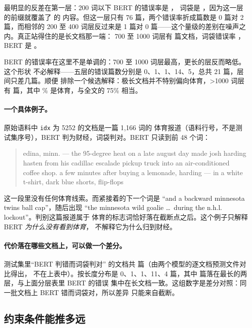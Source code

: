 \documentclass[11pt]{article}
\newcommand{\code}[1]{\texttt{\small #1}}
\begin{document}
最明显的反差在第一层：200 词以下 BERT 的错误率是 \resultByLenShortBert{}，
词袋是 \resultByLenShortBow{}，因为这一层的前缀就覆盖了 \resultSeenShort{} 的
内容。但这一层只有 76 篇，两个错误率折成篇数是 0 篇对 2 篇，而相邻的 200 至 400
词层反过来是 1 篇对 0 篇——这个量级的差别在噪声之内。真正站得住的是长文档那一端：
700 至 1000 词层有 \resultDocsPeak{} 篇文档，词袋错误率 \resultByLenPeakBow{}，
BERT 是 \resultByLenPeakBert{}。

BERT 的错误率在这里不是单调的：700 至 1000 词层最高，更长的层反而略低。这个形状
不必解释——五层的错误篇数分别是 0、1、1、14、5，总共 21 篇，层间只差几篇。顺便
排除一个候选解释：极长文档并不特别偏向体育，>1000 词层有 \resultLongestBinDocs{}
篇，其中 \resultLongestBinSports{}\% 是体育，与全文的 75\% 相当。



\paragraph{一个具体例子。} 原始语料中 \code{idx} 为 5252 的文档是一篇 1{,}166 词的
体育报道（语料行号，不是测试集序号），BERT 判为财经，词袋判对。BERT 只读到前 48
个词：

\begin{quote}\small
edina, minn. --- the 95-degree heat on a late august day made josh harding hasten
from his cadillac escalade pickup truck into an air-conditioned coffee shop. a few
minutes after buying a lemonade, harding --- in a white t-shirt, dark blue shorts,
flip-flops
\end{quote}

这一段里没有任何体育线索。而紧接着的下一个词是
``and a backward minnesota twins ball cap''，随后出现
``the minnesota wild goalie \dots\ during the n.h.l. lockout''。判别这篇报道属于
体育的标志词恰好落在截断点之后。这个例子只解释 BERT \emph{为什么没有看到体育}，
不解释它为什么归到财经。

\paragraph{代价落在哪些文档上，可以做一个差分。} 测试集里``BERT 判错而词袋判对''
的文档共 \resultBertWrongBowRight{} 篇（由两个模型的逐文档预测文件对比得出，
不在上表中）。按长度分布是 0、1、1、11、4 篇，其中
\resultBertWrongBowRightLong{} 篇落在最长的两层，与上面分层表里 BERT 的错误
集中在长文档一致。这组数字是差分对照：同一批文档上 BERT 错而词袋对，所以差异
只能来自截断。

\subsection{约束条件能推多远}
\end{document}
